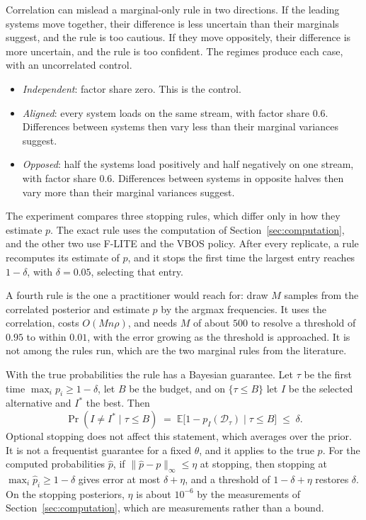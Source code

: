 \documentclass[11pt]{article}
\begin{document}
Correlation can mislead a marginal-only rule in two directions. If
the leading systems move together, their difference is less uncertain
than their marginals suggest, and the rule is too cautious. If they
move oppositely, their difference is more uncertain, and the rule is
too confident. The regimes produce each case, with an uncorrelated
control.

\begin{itemize}
\item \emph{Independent}: factor share zero. This is the control.
\item \emph{Aligned}: every system loads on the same stream, with
factor share $0.6$. Differences between systems then vary less than
their marginal variances suggest.
\item \emph{Opposed}: half the systems load positively and half
negatively on one stream, with factor share $0.6$. Differences between
systems in opposite halves then vary more than their marginal
variances suggest.
\end{itemize}

The experiment compares three stopping rules, which differ only in
how they estimate $p$. The exact rule uses the computation of
Section~\ref{sec:computation}, and the other two use F-LITE and the
VBOS policy. After every replicate, a rule recomputes its estimate of $p$, and it
stops the first time the largest entry reaches $1 - \delta$, with
$\delta = 0.05$, selecting that entry.

A fourth rule is the one a practitioner would reach for: draw $M$
samples from the correlated posterior and estimate $p$ by the argmax
frequencies. It uses the correlation, costs $O(M n \rho)$, and needs
$M$ of about $500$ to resolve a threshold of $0.95$ to within $0.01$,
with the error growing as the threshold is approached. It is not
among the rules run, which are the two marginal rules from the
literature.

With the true probabilities the rule has a Bayesian guarantee. Let $\tau$ be
the first time $\max_i p_i \ge 1 - \delta$, let $B$ be the budget, and
on $\{\tau \le B\}$ let $I$ be the selected alternative and $I^*$ the
best. Then
\begin{equation}
\Pr(I \ne I^* \mid \tau \le B)
\;=\; \mathbb{E}\bigl[1 - p_I(\mathcal{D}_\tau) \mid \tau \le B\bigr]
\;\le\; \delta .
\end{equation}
Optional stopping does not affect this statement, which averages over
the prior. It is not a frequentist guarantee for a fixed $\theta$, and
it applies to the true $p$. For the computed probabilities $\hat p$, if
$\|\hat p - p\|_\infty \le \eta$ at stopping, then stopping at
$\max_i \hat p_i \ge 1 - \delta$ gives error at most $\delta + \eta$,
and a threshold of $1 - \delta + \eta$ restores $\delta$. On the stopping
posteriors, $\eta$ is about $10^{-6}$ by the measurements of
Section~\ref{sec:computation}, which are measurements rather than a
bound.
\end{document}
